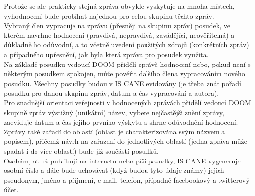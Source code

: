 \documentclass{article}
\begin{document}
    Protože se ale prakticky stejná zpráva obvykle vyskytuje na mnoha místech, vyhodnocení bude probíhat najednou pro celou skupinu těchto zpráv.\\
    Vybraný člen vypracuje na zprávu (přesněji na skupinu zpráv) posudek, ve kterém navrhne hodnocení (pravdivá, nepravdivá, zavádějící, neověřitelná) a důkladně ho odůvodní, a to včetně uvedení použitých zdrojů (konkrétních zpráv) a případného upřesnění, jak byla která zpráva pro posudek využita.\\
    Na základě posudku vedoucí DOOM přidělí zprávě hodnocení nebo, pokud není s některým posudkem spokojen, může pověřit dalšího člena vypracováním nového posudku. Všechny posudky budou v IS CANE evidovány (je třeba znát pořadí posudku pro danou skupinu zpráv, datum a čas vypracování a autora).\\
    Pro snadnější orientaci veřejnosti v hodnocených zprávách přidělí vedoucí DOOM skupině zpráv výstižný (unikátní) název, vybere nejčastější znění zprávy, zaeviduje datum a čas jejího prvního výskytu a shrne odůvodnění hodnocení. Zprávy také zařadí do oblastí (oblast je charakterizována svým názvem a popisem), přičemž návrh na zařazení do jednotlivých oblastí (jedna zpráva může spadat i do více oblastí) bude již součástí posudků.\\
Osobám, ať už publikují na internetu nebo píší posudky, IS CANE vygeneruje osobní číslo a dále bude uchovávat (když budou tyto údaje známy) jejich pseudonym, jméno a příjmení, e-mail, telefon, případně facebookový a twitterový účet.\\
    \newpage
\end{document}
